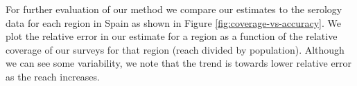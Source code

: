 \documentclass{article}
\begin{document}




For further evaluation of our method we compare our estimates to the serology data for each region in Spain as shown in Figure \ref{fig:coverage-vs-accuracy}. We plot the relative error in our estimate for a region as a function of the relative coverage of our surveys for that region (reach divided by population). Although we can see some variability, we note that the trend is towards lower relative error as the reach increases.  
\end{document}

